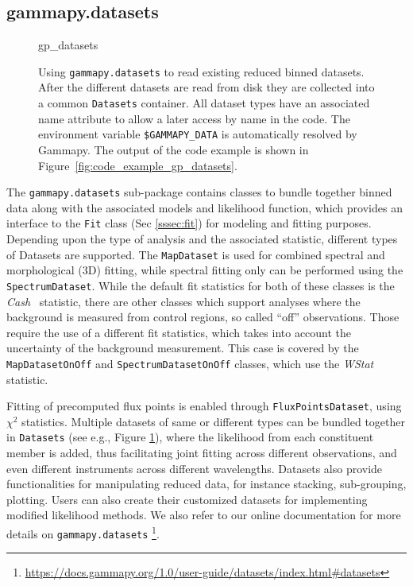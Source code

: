 \documentclass[longauth]{aa}
\newcommand{\code}[1]{\texttt{#1}}
\newcommand{\gammapy}{Gammapy\xspace}
\begin{document}
\subsection{gammapy.datasets}
\label{ssec:gammapy-datasets}
%
\begin{figure}
        \small
        {gp_datasets}
        \caption{
        Using \code{gammapy.datasets} to read existing reduced binned datasets.
        After the different datasets are read from disk they are collected into a
        common \code{Datasets} container. All dataset types have an associated
        name attribute to allow a later access by name in the code. The
        environment variable \code{\$GAMMAPY\_DATA} is automatically resolved
        by \gammapy. The output
                of the code example is shown in Figure~\ref{fig:code_example_gp_datasets}.
    }
        \label{fig*:minted:gp_datasets}
\end{figure}
%
The \code{gammapy.datasets} sub-package contains classes to bundle
together binned data along with the associated models and likelihood function, which
provides an interface to the \code{Fit} class (Sec \ref{sssec:fit}) for
modeling and fitting purposes. Depending upon the type of analysis and the
associated statistic, different types of Datasets are supported. The \code{MapDataset} is
used for combined spectral and morphological (3D) fitting, while spectral 
fitting only can be performed using the \code{SpectrumDataset}.
While the default fit statistics for both of these classes is the \emph{Cash}~\citep{Cash}
statistic, there are other classes which support
analyses where the background is measured from control regions, so called \enquote{off} observations.
Those require the use of a different fit statistics, which takes into account the
uncertainty of the background measurement. This case is covered by the \code{MapDatasetOnOff}
and \code{SpectrumDatasetOnOff} classes, which use the \emph{WStat}~\citep{WStat} statistic.

Fitting of precomputed flux points is enabled through \code{FluxPointsDataset},
using \emph{$\chi^2$} statistics. Multiple datasets of same or different types can be
bundled together in \code{Datasets} (see e.g., Figure \ref{fig*:minted:gp_datasets}),
where the likelihood from each constituent member is added, thus facilitating
joint fitting across different observations, and even different instruments
across different wavelengths. Datasets also provide functionalities for
manipulating reduced data, for instance stacking, sub-grouping, plotting. Users can
also create their customized datasets for implementing modified likelihood
methods. We also refer to our online documentation for more details on \code{gammapy.datasets}
\footnote{\url{https://docs.gammapy.org/1.0/user-guide/datasets/index.html\#datasets}}.
\end{document}
